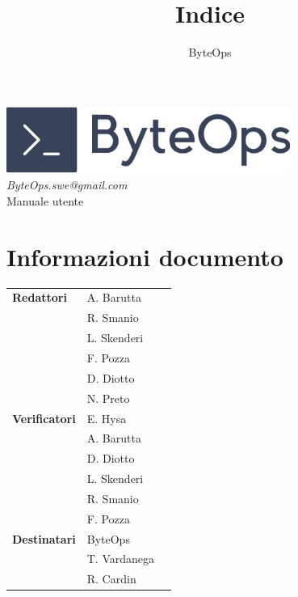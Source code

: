 \documentclass{article}
\title{\textbf{\fontsize{30}{6}\selectfont Indice}}
\author{\fontsize{14}{6}\selectfont ByteOps}
\date{}
\begin{document}
\pagestyle{fancy}
\begin{center}
    \includegraphics[width = 0.7\textwidth]{../Images/logo.png} \\
    \vspace{0.2cm}
    \textcolor[RGB]{60, 60, 60}{\textit{ByteOps.swe@gmail.com}} \\
    \vspace{1cm}
    \fontsize{16}{6}\selectfont Manuale utente \\
    \vspace{0.5cm}
\end{center}

\section*{Informazioni documento}
\def\arraystretch{1.2}
\begin{tabular}{>{\raggedleft\arraybackslash}p{}|>{\raggedright\arraybackslash}p{}c}
    \hline
    \addlinespace
    \textbf{Redattori}    & A. Barutta\\ & R. Smanio\\ & L. Skenderi\\ & F. Pozza\\ & D. Diotto \\ & N. Preto \vspace{10pt} \\
    \textbf{Verificatori} & E. Hysa\\ & A. Barutta\\ & D. Diotto\\ & L. Skenderi\\ & R. Smanio\\ & F. Pozza \vspace{10pt} \\
    \textbf{Destinatari}  & ByteOps\\ & T. Vardanega   \\ & R. Cardin \vspace{10pt} \\
\end{tabular}
\pagebreak

\end{document}
